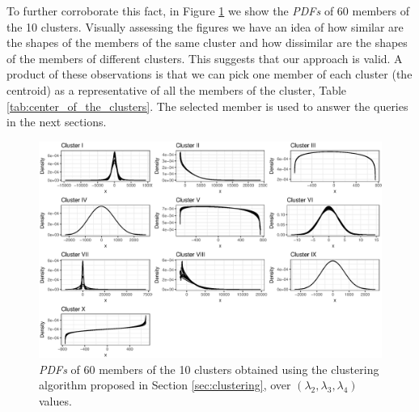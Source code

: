 To further corroborate this fact, in Figure \ref{fig:cluster1} we show the \textit{PDFs} of 60 members of the 10 clusters. Visually assessing the figures we have an idea of how similar are the shapes of the members of the same cluster and how dissimilar are the shapes of the  members of different clusters. This suggests that our approach is valid. A product of these observations is that we can pick one member of each cluster (the centroid) as a representative of all the members of the cluster, Table \ref{tab:center_of_the_clusters}. The selected member is used to answer the queries in the next sections.

\begin{figure}[H]
    \centering
    \includegraphics[width=\textwidth]{img/use_cases/clusters.eps}
    \caption{\textit{PDFs} of 60 members of the 10 clusters obtained using the clustering algorithm proposed in Section \ref{sec:clustering}, over $(\lambda_{2}, \lambda_{3}, \lambda_{4})$ values.}
    \label{fig:cluster1}
\end{figure}


